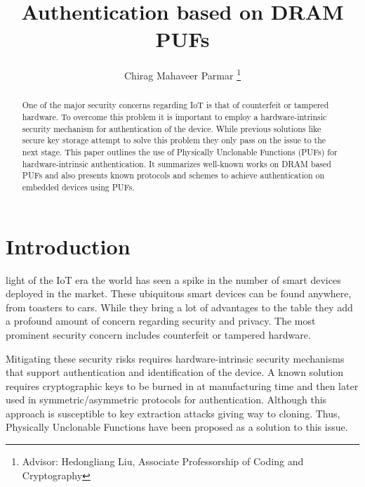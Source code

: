 \documentclass[journal, a4paper]{IEEEtran}
\begin{document}
\title{Authentication based on DRAM PUFs}
\author{Chirag Mahaveer Parmar
\thanks{Advisor: Hedongliang Liu, Associate Professorship of Coding and Cryptography}}
\maketitle

\begin{abstract}
One of the major security concerns regarding IoT is that of counterfeit or tampered hardware. To overcome this problem it is important to employ a hardware-intrinsic security mechanism for authentication of the device. While previous solutions like secure key storage attempt to solve this problem they only pass on the issue to the next stage. This paper outlines the use of Physically Unclonable Functions (PUFs) for hardware-intrinsic authentication. It summarizes well-known works on DRAM based PUFs and also presents known protocols and schemes to achieve authentication on embedded devices using PUFs.
\end{abstract}

\section{Introduction}
 light of the IoT era the world has seen a spike in the number of smart devices deployed in the market. These ubiquitous smart devices can be found anywhere, from toasters to cars. While they bring a lot of advantages to the table they add a profound amount of concern regarding security and privacy. \cite{EMVT12} The most prominent security concern includes counterfeit or tampered hardware. \cite{PEC06} 

Mitigating these security risks requires hardware-intrinsic security mechanisms that support authentication and identification of the device. A known solution requires cryptographic keys to be burned in at manufacturing time and then later used in symmetric/asymmetric protocols for authentication. Although this approach is susceptible to key extraction attacks giving way to cloning. Thus, Physically Unclonable Functions have been proposed as a solution to this issue.
\end{document}
